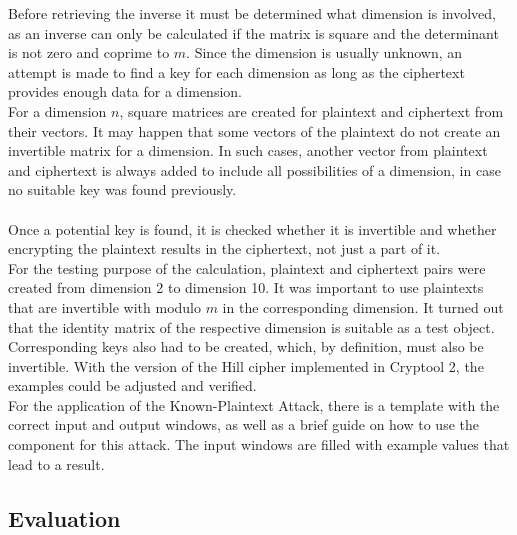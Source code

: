 \documentclass[conference]{IEEEtran}
\begin{document}
Before retrieving the inverse it must be determined what dimension is involved, as an inverse can only be calculated if the matrix is square and the determinant is not zero and coprime to \(m\). Since the dimension is usually unknown, an attempt is made to find a key for each dimension as long as the ciphertext provides enough data for a dimension.
\\
For a dimension \(n\), square matrices are created for plaintext and ciphertext from their vectors. It may happen that some vectors of the plaintext do not create an invertible matrix for a dimension. In such cases, another vector from plaintext and ciphertext is always added to include all possibilities of a dimension, in case no suitable key was found previously.
\\\\
Once a potential key is found, it is checked whether it is invertible and whether encrypting the plaintext results in the ciphertext, not just a part of it.
\\
For the testing purpose of the calculation, plaintext and ciphertext pairs were created from dimension 2 to dimension 10. It was important to use plaintexts that are invertible with modulo \(m\) in the corresponding dimension. It turned out that the identity matrix of the respective dimension is suitable as a test object. Corresponding keys also had to be created, which, by definition, must also be invertible. With the version of the Hill cipher implemented in Cryptool 2, the examples could be adjusted and verified.
\\
For the application of the Known-Plaintext Attack, there is a template with the correct input and output windows, as well as a brief guide on how to use the component for this attack. The input windows are filled with example values that lead to a result.
\\

\subsection{Evaluation}
\end{document}
